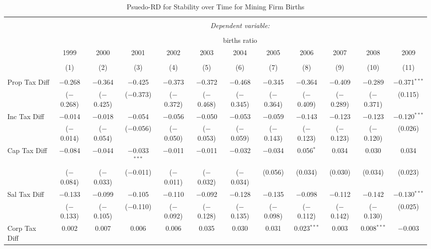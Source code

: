 
\begin{table}[!htbp] \centering 
  \caption{Psuedo-RD for Stability over Time for  Mining Firm Births} 
  \label{21year} 
\small 
\begin{tabular}{@{\extracolsep{5pt}}lccccccccccc} 
\\[-1.8ex]\hline 
\hline \\[-1.8ex] 
 & \multicolumn{11}{c}{\textit{Dependent variable:}} \\ 
\cline{2-12} 
\\[-1.8ex] & \multicolumn{11}{c}{births ratio} \\ 
 & 1999 & 2000 & 2001 & 2002 & 2003 & 2004 & 2005 & 2006 & 2007 & 2008 & 2009 \\ 
\\[-1.8ex] & (1) & (2) & (3) & (4) & (5) & (6) & (7) & (8) & (9) & (10) & (11)\\ 
\hline \\[-1.8ex] 
 Prop Tax Diff & $-$0.268 & $-$0.364 & $-$0.425 & $-$0.373 & $-$0.372 & $-$0.468 & $-$0.345 & $-$0.364 & $-$0.409 & $-$0.289 & $-$0.371$^{***}$ \\ 
  & ($-$0.268) & ($-$0.425) & ($-$0.373) & ($-$0.372) & ($-$0.468) & ($-$0.345) & ($-$0.364) & ($-$0.409) & ($-$0.289) & ($-$0.371) & (0.115) \\ 
  Inc Tax Diff & $-$0.014 & $-$0.018 & $-$0.054 & $-$0.056 & $-$0.050 & $-$0.053 & $-$0.059 & $-$0.143 & $-$0.123 & $-$0.123 & $-$0.120$^{***}$ \\ 
  & ($-$0.014) & ($-$0.054) & ($-$0.056) & ($-$0.050) & ($-$0.053) & ($-$0.059) & ($-$0.143) & ($-$0.123) & ($-$0.123) & ($-$0.120) & (0.026) \\ 
  Cap Tax Diff & $-$0.084 & $-$0.044 & $-$0.033$^{***}$ & $-$0.011 & $-$0.011 & $-$0.032 & $-$0.034 & 0.056$^{*}$ & 0.034 & 0.030 & 0.034 \\ 
  & ($-$0.084) & ($-$0.033) & ($-$0.011) & ($-$0.011) & ($-$0.032) & ($-$0.034) & (0.056) & (0.034) & (0.030) & (0.034) & (0.023) \\ 
  Sal Tax Diff & $-$0.133 & $-$0.099 & $-$0.105 & $-$0.110 & $-$0.092 & $-$0.128 & $-$0.135 & $-$0.098 & $-$0.112 & $-$0.142 & $-$0.130$^{***}$ \\ 
  & ($-$0.133) & ($-$0.105) & ($-$0.110) & ($-$0.092) & ($-$0.128) & ($-$0.135) & ($-$0.098) & ($-$0.112) & ($-$0.142) & ($-$0.130) & (0.025) \\ 
  Corp Tax Diff & 0.002 & 0.007 & 0.006 & 0.006 & 0.035 & 0.030 & 0.031 & 0.023$^{***}$ & 0.003 & 0.008$^{***}$ & $-$0.003 \\ 

\end{tabular}
\end{table}
